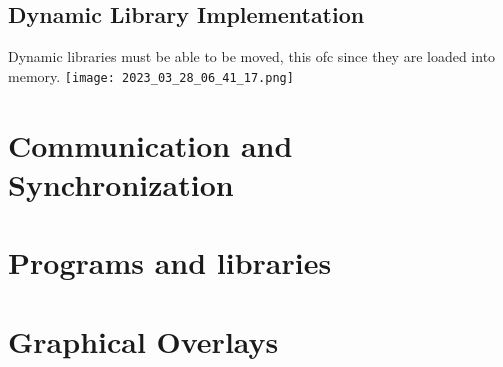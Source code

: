 \documentclass[main.tex,fontsize=8pt,paper=a4,paper=portrait,DIV=calc,]{scrartcl}
\begin{document}
\subsection{Dynamic Library Implementation}
Dynamic libraries must be able to be moved, this ofc since they are loaded into memory.\newline
\texttt{[image: 2023\_03\_28\_06\_41\_17.png]}

\section{Communication and Synchronization}

\section{Programs and libraries}

\section{Graphical Overlays}
\end{document}
